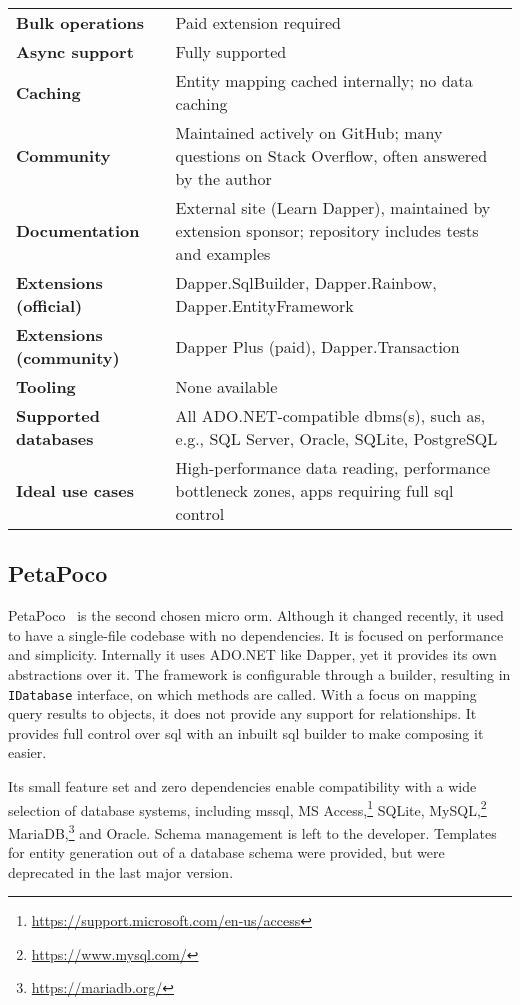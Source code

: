 {\begin{landscape}
\begin{table}[H]
\begin{tabular}{ll}
\textbf{Bulk operations} & Paid extension required \\
\textbf{Async support} & Fully supported \\
\textbf{Caching} & Entity mapping cached internally; no data caching \\
\textbf{Community} & Maintained actively on GitHub; many questions on Stack Overflow, often answered by the author \\
\textbf{Documentation} & External site (Learn Dapper), maintained by extension sponsor; repository includes tests and examples \\
\textbf{Extensions (official)} & Dapper.SqlBuilder, Dapper.Rainbow, Dapper.EntityFramework \\
\textbf{Extensions (community)} & Dapper Plus (paid), Dapper.Transaction \\
\textbf{Tooling} & None available \\
\textbf{Supported databases} & All ADO.NET-compatible \acrshort{dbms}(s), such as, e.g., SQL Server, Oracle, SQLite, PostgreSQL \\
\textbf{Ideal use cases} & High-performance data reading, performance bottleneck zones, apps requiring full \acrshort{sql} control \\
\bottomrule
\end{tabular}
\end{table}
\end{landscape}
}

\subsection{PetaPoco}
\label{sec:feat_petapoco}

PetaPoco~\cite{PetaPoco} is the second chosen micro \acrshort{orm}. Although it changed recently, it used to have a single-file codebase with no dependencies. It is focused on performance and simplicity. Internally it uses ADO.NET like Dapper, yet it provides its own abstractions over it. The framework is configurable through a builder, resulting in \texttt{IDatabase} interface, on which methods are called. With a focus on mapping query results to objects, it does not provide any support for relationships. It provides full control over \acrshort{sql} with an inbuilt \acrshort{sql} builder to make composing it easier. 

Its small feature set and zero dependencies enable compatibility with a wide selection of database systems, including \acrshort{mssql}, MS Access,\footnote{\url{https://support.microsoft.com/en-us/access}} SQLite, MySQL,\footnote{\url{https://www.mysql.com/}} MariaDB,\footnote{\url{https://mariadb.org/}} and Oracle. Schema management is left to the developer. Templates for entity generation out of a database schema were provided, but were deprecated in the last major version.


